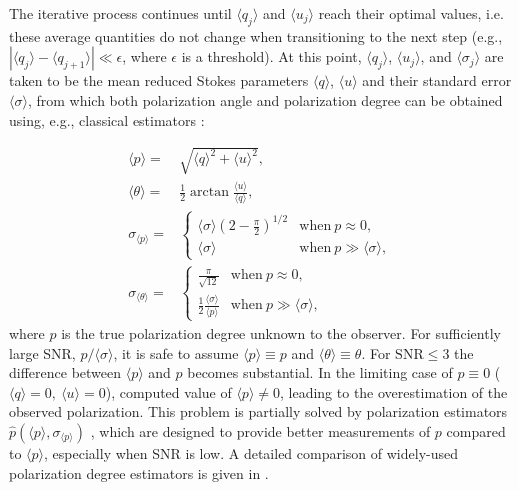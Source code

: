 The iterative process continues until $ \langle q_j \rangle $ and $ \langle u_j \rangle $ reach their optimal values, i.e. these average quantities do not change when transitioning to the next step (e.g., $\left| \langle q_j \rangle  -  \langle q_{j + 1} \rangle  \right| \ll \epsilon$, where $\epsilon$ is a threshold).
At this point, $ \langle q_j \rangle $, $ \langle u_j \rangle $, and $ \langle \sigma_j \rangle $ are taken to be the mean reduced Stokes parameters $ \langle q \rangle $, $ \langle u \rangle $ and their standard error $ \langle \sigma \rangle $, from which both polarization angle and polarization degree can be obtained using, e.g., classical estimators \citep{Serkowski1962, NaghizadehKhouei1993}:

\begin{equation}
    \begin{aligned}
         \langle p \rangle  =& \sqrt{ \langle q \rangle ^2 +  \langle u \rangle ^2}, \\
         \langle \theta \rangle  =& \frac{1}{2}\arctan \frac{ \langle u \rangle }{ \langle q \rangle }, \\
        \sigma_{ \langle p \rangle } =& 
            \begin{cases}
                 \langle \sigma \rangle \left(2 - \frac{\pi}{2}\right)^{1/2} &\mathrm{when}~p \approx 0, \\
                 \langle \sigma \rangle  &\mathrm{when}~p \gg  \langle \sigma \rangle ,
            \end{cases} \\
        \sigma_{ \langle \theta \rangle } =& 
            \begin{cases}
                \frac{\pi}{\sqrt{12}} &\mathrm{when}~p \approx 0, \\
                \frac{1}{2}\frac{ \langle \sigma \rangle }{ \langle p \rangle } &\mathrm{when}~p \gg  \langle \sigma \rangle ,
            \end{cases}
    \end{aligned}
\end{equation}
where $p$ is the true polarization degree unknown to the observer.
For sufficiently large \gls{SNR}, $p /  \langle \sigma \rangle $, it is safe to assume $ \langle p \rangle  \equiv p$ and $ \langle \theta \rangle  \equiv \theta$.
For $\mathrm{SNR} \le 3$ \citep[based on numerical simulations, see, e.g.,][]{Montier2015} the difference between $ \langle p \rangle $ and $p$ becomes substantial.
In the limiting case of $p \equiv 0$ ($ \langle q \rangle  = 0,~ \langle u \rangle  = 0$), computed value of $ \langle p \rangle  \neq 0$, leading to the overestimation of the observed polarization.
This problem is partially solved by polarization estimators $\hat{p}\left( \langle p \rangle , \sigma_{ \langle p \rangle }\right)$ \citep{Simmons1985}, which are designed to provide better measurements of $p$ compared to $ \langle p \rangle $, especially when \gls{SNR} is low.
A detailed comparison of widely-used polarization degree estimators is given in \citet{Montier2015a}.

